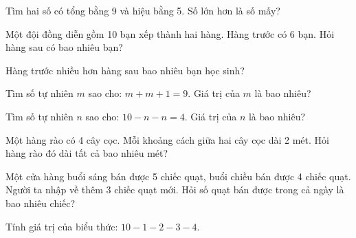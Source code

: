 \begin{ex}
Tìm hai số có tổng bằng 9 và hiệu bằng 5. Số lớn hơn là số mấy?
\end{ex}

\begin{ex}
Một đội đồng diễn gồm 10 bạn xếp thành hai hàng. Hàng trước có 6 bạn. Hỏi hàng sau có bao nhiêu bạn?
\end{ex}

\begin{ex}
Hàng trước nhiều hơn hàng sau bao nhiêu bạn học sinh?
\end{ex}

\begin{ex}
Tìm số tự nhiên $m$ sao cho: $m + m + 1 = 9$. Giá trị của $m$ là bao nhiêu?
\end{ex}

\begin{ex}
Tìm số tự nhiên $n$ sao cho: $10 - n - n = 4$. Giá trị của $n$ là bao nhiêu?
\end{ex}

\begin{ex}
Một hàng rào có 4 cây cọc. Mỗi khoảng cách giữa hai cây cọc dài 2 mét. Hỏi hàng rào đó dài tất cả bao nhiêu mét?
\end{ex}

\begin{ex}
Một cửa hàng buổi sáng bán được 5 chiếc quạt, buổi chiều bán được 4 chiếc quạt. Người ta nhập về thêm 3 chiếc quạt mới. Hỏi số quạt bán được trong cả ngày là bao nhiêu chiếc?
\end{ex}

\begin{ex}
Tính giá trị của biểu thức: $10 - 1 - 2 - 3 - 4$.
\end{ex}
